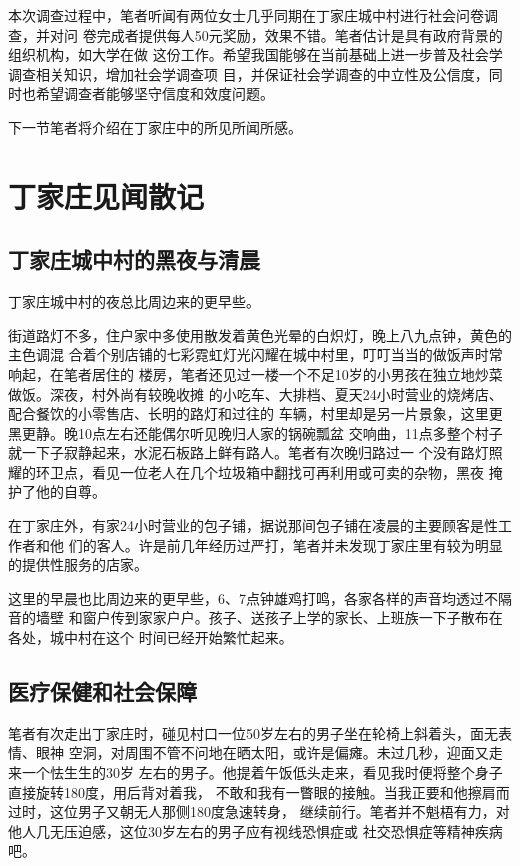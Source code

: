 本次调查过程中，笔者听闻有两位女士几乎同期在丁家庄城中村进行社会问卷调查，并对问
卷完成者提供每人50元奖励，效果不错。笔者估计是具有政府背景的组织机构，如大学在做
这份工作。希望我国能够在当前基础上进一步普及社会学调查相关知识，增加社会学调查项
目，并保证社会学调查的中立性及公信度，同时也希望调查者能够坚守信度和效度问题。

下一节笔者将介绍在丁家庄中的所见所闻所感。

\section{丁家庄见闻散记}

\subsection{丁家庄城中村的黑夜与清晨}

丁家庄城中村的夜总比周边来的更早些。

街道路灯不多，住户家中多使用散发着黄色光晕的白炽灯，晚上八九点钟，黄色的主色调混
合着个别店铺的七彩霓虹灯光闪耀在城中村里，叮叮当当的做饭声时常响起，在笔者居住的
楼房，笔者还见过一楼一个不足10岁的小男孩在独立地炒菜做饭。深夜，村外尚有较晚收摊
的小吃车、大排档、夏天24小时营业的烧烤店、配合餐饮的小零售店、长明的路灯和过往的
车辆，村里却是另一片景象，这里更黑更静。晚10点左右还能偶尔听见晚归人家的锅碗瓢盆
交响曲，11点多整个村子就一下子寂静起来，水泥石板路上鲜有路人。笔者有次晚归路过一
个没有路灯照耀的环卫点，看见一位老人在几个垃圾箱中翻找可再利用或可卖的杂物，黑夜
掩护了他的自尊。

在丁家庄外，有家24小时营业的包子铺，据说那间包子铺在凌晨的主要顾客是性工作者和他
们的客人。许是前几年经历过严打，笔者并未发现丁家庄里有较为明显的提供性服务的店家。

这里的早晨也比周边来的更早些，6、7点钟雄鸡打鸣，各家各样的声音均透过不隔音的墙壁
和窗户传到家家户户。孩子、送孩子上学的家长、上班族一下子散布在各处，城中村在这个
时间已经开始繁忙起来。

\subsection{医疗保健和社会保障}

笔者有次走出丁家庄时，碰见村口一位50岁左右的男子坐在轮椅上斜着头，面无表情、眼神
空洞，对周围不管不问地在晒太阳，或许是偏瘫。未过几秒，迎面又走来一个怯生生的30岁
左右的男子。他提着午饭低头走来，看见我时便将整个身子直接旋转180度，用后背对着我，
不敢和我有一瞥眼的接触。当我正要和他擦肩而过时，这位男子又朝无人那侧180度急速转身，
继续前行。笔者并不魁梧有力，对他人几无压迫感，这位30岁左右的男子应有视线恐惧症或
社交恐惧症等精神疾病吧。

